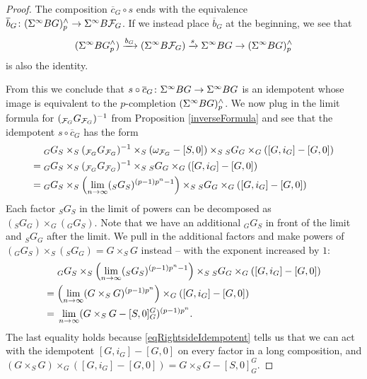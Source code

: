 \documentclass[10pt]{amsart}
\theoremstyle{definition}
\begin{document}
\begin{proof}
The composition $\overline c_G\circ s$ ends with the equivalence $\overline b_G\colon (\Sigma^{\infty} BG)^\wedge_p \to \Sigma^{\infty} B\mathcal{F}_G$. If we instead place $\overline b_G$ at the beginning, we see that
\[
(\Sigma^{\infty} BG^\wedge_p) \xrightarrow{b_G} (\Sigma^{\infty} B\mathcal{F}_G) \xrightarrow{s} \Sigma^{\infty} BG \to (\Sigma^{\infty} BG)^\wedge_p
\]
is also the identity.

From this we conclude that $s\circ \overline c_G\colon \Sigma^{\infty} BG \to \Sigma^{\infty} BG$ is an idempotent whose image is equivalent to the $p$-completion $(\Sigma^{\infty} BG)^\wedge_p$. We now plug in the limit formula for $({}_{\mathcal{F}_G}G_{\mathcal{F}_G})^{-1}$ from Proposition \ref{inverseFormula} and see that the idempotent $s\circ \overline c_G$ has the form
\begin{align*}
& {}_GG_{S} \times_S ({}_{\mathcal{F}_G}G_{\mathcal{F}_G})^{-1} \times_S (\omega_{\mathcal{F}_G} - [S,0]) \times_S {}_S G_G \times_G ([G,i_G] - [G,0])
\\ ={}& {}_GG_{S} \times_S ({}_{\mathcal{F}_G}G_{\mathcal{F}_G})^{-1} \times_S {}_S G_G \times_G ([G,i_G] - [G,0])
\\ ={}& {}_GG_{S} \times_S \Bigl(\lim_{n\to\infty} ({}_S G_S)^{(p-1)p^n-1} \Bigr) \times_S {}_S G_G \times_G ([G,i_G] - [G,0])
\end{align*}
Each factor ${}_S G_S$ in the limit of powers can be decomposed as $({}_S G_G) \times_G ({}_G G_S)$. Note that we have an additional ${}_G G_S$ in front of the limit and ${}_S G_G$ after the limit. We pull in the additional factors and make powers of $({}_G G_S)\times_S ({}_S G_G)=G\times_S G$ instead -- with the exponent increased by $1$:
\begin{align*}
& {}_GG_{S} \times_S \Bigl(\lim_{n\to\infty} ({}_S G_S)^{(p-1)p^n-1} \Bigr) \times_S {}_S G_G \times_G ([G,i_G] - [G,0])
\\ ={}& \Bigl(\lim_{n\to\infty} (G \times_S G)^{(p-1)p^n} \Bigr) \times_G ([G,i_G] - [G,0])
\\ ={}& \lim_{n\to\infty} (G \times_S G - [S,0]_G^G)^{(p-1)p^n}.
\end{align*}
The last equality holds because \eqref{eqRightsideIdempotent} tells us that we can act with the idempotent $[G,i_G] - [G,0]$  on every factor in a long composition, and $(G \times_S G)\times_G ([G,i_G] - [G,0]) = G \times_S G - [S,0]_G^G$.
\end{proof}
\end{document}
